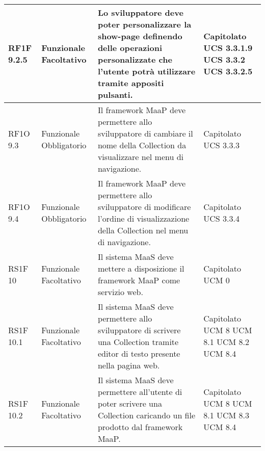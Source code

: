 \begin{center}
\begin{longtable}{ | l | p{2cm} | p{5cm} | p{1.7cm} |}
        RF1F 9.2.5 & Funzionale \newline  Facoltativo  & Lo sviluppatore deve poter personalizzare la show-page definendo delle operazioni personalizzate che l’utente potrà utilizzare tramite appositi pulsanti. &  Capitolato \newline  UCS 3.3.1.9 \newline  UCS 3.3.2 \newline  UCS 3.3.2.5 \newline  \\ \hline      
        RF1O 9.3 & Funzionale \newline  Obbligatorio  & Il framework MaaP deve permettere allo sviluppatore di cambiare il nome della Collection da visualizzare nel menu di navigazione. &  Capitolato \newline  UCS 3.3.3 \newline  \\ \hline      
        RF1O 9.4 & Funzionale \newline  Obbligatorio  & Il framework MaaP deve permettere allo sviluppatore di modificare l’ordine di visualizzazione della Collection nel menu di navigazione. &  Capitolato \newline  UCS 3.3.4 \newline  \\ \hline      
        RS1F 10 & Funzionale \newline  Facoltativo  & Il sistema MaaS deve mettere a disposizione il framework MaaP come servizio web. &  Capitolato \newline  UCM 0 \newline  \\ \hline      
        RS1F 10.1 & Funzionale \newline  Facoltativo  & Il sistema MaaS deve permettere allo sviluppatore di scrivere una Collection tramite editor di testo presente nella pagina web. &  Capitolato \newline  UCM 8 \newline  UCM 8.1 \newline  UCM 8.2 \newline  UCM 8.4 \newline  \\ \hline      
        RS1F 10.2 & Funzionale \newline  Facoltativo  & Il sistema MaaS deve permettere all’utente di poter scrivere una Collection caricando un file prodotto dal framework MaaP. &  Capitolato \newline  UCM 8 \newline  UCM 8.1 \newline  UCM 8.3 \newline  UCM 8.4 \newline  \\ \hline      

\end{longtable}
\end{center}
